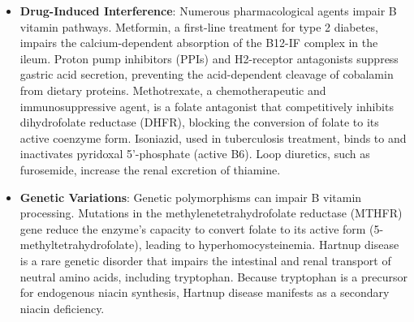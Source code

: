 \begin{itemize}
    \item \textbf{Drug-Induced Interference}: Numerous pharmacological agents impair B vitamin pathways. Metformin, a first-line treatment for type 2 diabetes, impairs the calcium-dependent absorption of the B12-IF complex in the ileum. Proton pump inhibitors (PPIs) and H2-receptor antagonists suppress gastric acid secretion, preventing the acid-dependent cleavage of cobalamin from dietary proteins. Methotrexate, a chemotherapeutic and immunosuppressive agent, is a folate antagonist that competitively inhibits dihydrofolate reductase (DHFR), blocking the conversion of folate to its active coenzyme form. Isoniazid, used in tuberculosis treatment, binds to and inactivates pyridoxal 5'-phosphate (active B6). Loop diuretics, such as furosemide, increase the renal excretion of thiamine.
    \item \textbf{Genetic Variations}: Genetic polymorphisms can impair B vitamin processing. Mutations in the methylenetetrahydrofolate reductase (MTHFR) gene reduce the enzyme's capacity to convert folate to its active form (5-methyltetrahydrofolate), leading to hyperhomocysteinemia. Hartnup disease is a rare genetic disorder that impairs the intestinal and renal transport of neutral amino acids, including tryptophan. Because tryptophan is a precursor for endogenous niacin synthesis, Hartnup disease manifests as a secondary niacin deficiency.
\end{itemize}

